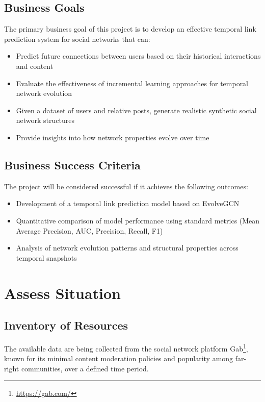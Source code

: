 \subsection*{Business Goals}
The primary business goal of this project is to develop an effective temporal link prediction system for social networks that can:

\begin{itemize}
	\item Predict future connections between users based on their historical interactions and content
	\item Evaluate the effectiveness of incremental learning approaches for temporal network evolution
	\item Given a dataset of users and relative posts, generate realistic synthetic social network structures
	\item Provide insights into how network properties evolve over time
\end{itemize}

\subsection*{Business Success Criteria}
\label{sec:business_success}
The project will be considered successful if it achieves the following outcomes:

\begin{itemize}
	\item Development of a temporal link prediction model based on EvolveGCN
	\item Quantitative comparison of model performance using standard metrics (Mean Average Precision, AUC, Precision, Recall, F1)
	\item Analysis of network evolution patterns and structural properties across temporal snapshots
\end{itemize}

\section{Assess Situation}

\subsection*{Inventory of Resources}

The available data are being collected from the social network platform Gab\footnote{\url{https://gab.com/}}, known for its minimal content moderation policies and popularity among far-right communities, over a defined time period.

